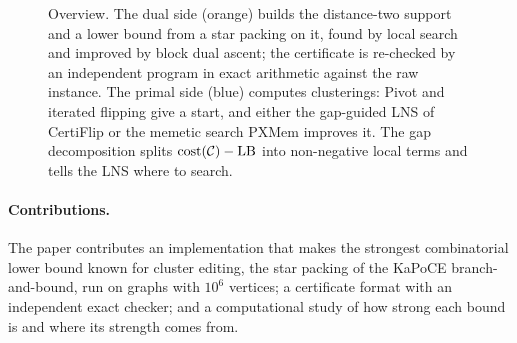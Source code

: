 \begin{figure}[!tbp]
\centering
\resizebox{\textwidth}{!}{}
\caption{Overview.  The dual side (orange) builds the distance-two support
and a lower bound from a star packing on it, found by local search and
improved by block dual ascent; the
certificate is re-checked by an independent program in exact arithmetic
against the raw instance.  The primal side (blue) computes clusterings: Pivot
and iterated flipping give a start, and either the gap-guided LNS of
CertiFlip or the memetic search PXMem improves it.  The gap decomposition
splits $\mathrm{cost}(\mathcal C)-\mathrm{LB}$ into non-negative local terms and tells the LNS
where to search.}
\label{fig:overview}
\end{figure}

\paragraph{Contributions.}  The paper contributes an implementation that
makes the strongest combinatorial lower bound known for cluster editing, the
star packing of the KaPoCE branch-and-bound, run on graphs with $10^6$
vertices; a certificate format with an independent exact checker; and a
computational study of how strong each bound is and where its strength comes
from.
